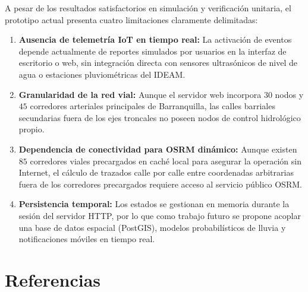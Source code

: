 \documentclass[12pt,letterpaper]{article}
\begin{document}
A pesar de los resultados satisfactorios en simulación y verificación unitaria, el prototipo actual presenta cuatro limitaciones claramente delimitadas:
\begin{enumerate}[leftmargin=2.0cm]
    \item \textbf{Ausencia de telemetría IoT en tiempo real:} La activación de eventos depende actualmente de reportes simulados por usuarios en la interfaz de escritorio o web, sin integración directa con sensores ultrasónicos de nivel de agua o estaciones pluviométricas del IDEAM.
    \item \textbf{Granularidad de la red vial:} Aunque el servidor web incorpora $30$ nodos y $45$ corredores arteriales principales de Barranquilla, las calles barriales secundarias fuera de los ejes troncales no poseen nodos de control hidrológico propio.
    \item \textbf{Dependencia de conectividad para OSRM dinámico:} Aunque existen $85$ corredores viales precargados en caché local para asegurar la operación sin Internet, el cálculo de trazados calle por calle entre coordenadas arbitrarias fuera de los corredores precargados requiere acceso al servicio público OSRM.
    \item \textbf{Persistencia temporal:} Los estados se gestionan en memoria durante la sesión del servidor HTTP, por lo que como trabajo futuro se propone acoplar una base de datos espacial (PostGIS), modelos probabilísticos de lluvia y notificaciones móviles en tiempo real.
\end{enumerate}

\newpage
\section{Referencias}
\end{document}
